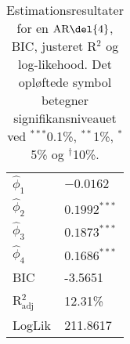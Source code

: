 \begin{table}[h]
\center
\begin{tabular}{ll}
\toprule
$\widehat{\phi}_1$ &$ -0.0162 $ \\
$\widehat{\phi}_2$ & $0.1992^{***}$  \\
$\widehat{\phi}_3$ &$0.1873^{***}$  \\
$\widehat{\phi}_4$ &$0.1686^{***} $ \\ \midrule
BIC & -3.5651 \\
 R$^2_{\text{adj}}$ & 12.31\% \\
LogLik &  211.8617\\ \bottomrule
 \end{tabular}
\caption{Estimationsresultater for en \(\text{AR} \del{4}\), BIC, justeret R$^2$ og log-likehood. Det opløftede symbol betegner signifikansniveauet ved $^{***}$0.1\%, $^{**}$1\%, $^{*}$5\% og $^{\dagger}$10\%.} \label{tab:est_ar}
\end{table}